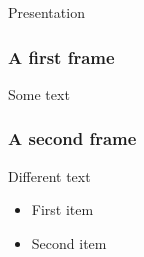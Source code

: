 \documentclass{beamer}
\begin{document}
\begin{frame}
Presentation
\end{frame}

\begin{frame}
\frametitle{A first frame}
Some text
\end{frame}

\begin{frame}
\frametitle{A second frame}
Different text
\begin{itemize}
    \item First item
    \item Second item
\end{itemize}
\end{frame}
\end{document}
